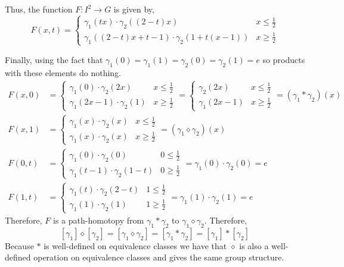 \documentclass[12pt]{extarticle}
\begin{document}
\begin{enumerate}
\begin{center}
\end{center}   

Thus, the function $F : I^2 \to G$ is given by, 
\[F(x,t) = 
\begin{cases}
\gamma_1(tx) \cdot \gamma_2((2-t)x) & x \le \frac{1}{2} \\
\gamma_1((2-t)x + t - 1) \cdot \gamma_2(1 + t(x - 1)) & x \ge \frac{1}{2}
\end{cases}\]

Finally, using the fact that $\gamma_1(0) = \gamma_1(1) = \gamma_2(0) = \gamma_2(1) = e$ so products with these elements do nothing. 
\begin{align*}
F(x,0) &= 
\begin{cases}
\gamma_1(0) \cdot \gamma_2(2x) & x \le \frac{1}{2} \\
\gamma_1(2x - 1) \cdot \gamma_2(1) & x \ge \frac{1}{2}
\end{cases} = 
\begin{cases}
\gamma_2(2x) & x \le \frac{1}{2} \\
\gamma_1(2x - 1) & x \ge \frac{1}{2}
\end{cases}
= (\gamma_1 * \gamma_2)(x)
\\
F(x,1) &= 
\begin{cases}
\gamma_1(x) \cdot \gamma_2(x) & x \le \frac{1}{2} \\
\gamma_1(x) \cdot \gamma_2(x) & x \ge \frac{1}{2}
\end{cases}
= (\gamma_1 \diamond \gamma_2)(x)
\\
F(0,t) &= 
\begin{cases}
\gamma_1(0) \cdot \gamma_2(0) & 0 \le \frac{1}{2} \\
\gamma_1(t - 1) \cdot \gamma_2(1 - t) & 0 \ge \frac{1}{2}
\end{cases}
= \gamma_1(0) \cdot \gamma_2(0) = e
\\
F(1,t) &= 
\begin{cases}
\gamma_1(t) \cdot \gamma_2(2-t) & 1 \le \frac{1}{2} \\
\gamma_1(1) \cdot \gamma_2(1) & 1 \ge \frac{1}{2}
\end{cases}
= \gamma_1(1) \cdot \gamma_2(1) = e
\end{align*}
Therefore, $F$ is a path-homotopy from $\gamma_1 * \gamma_2$ to $\gamma_1 \diamond \gamma_2$. Therefore, 
\[[\gamma_1] \diamond [\gamma_2] = [\gamma_1 \diamond \gamma_2] = [\gamma_1 * \gamma_2] = [\gamma_1] * [\gamma_2]\]
Because $*$ is well-defined on equivalence classes we have that $\diamond$ is also a well-defined operation on equivalence classes and gives the same group structure. 


\end{enumerate}
\end{document}
